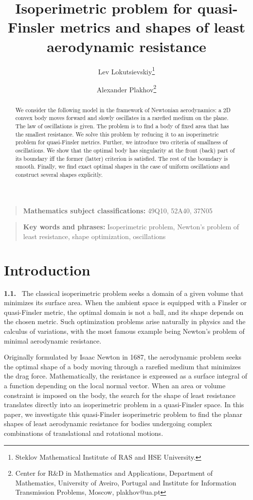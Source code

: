 \documentclass[a4paper,12pt]{article}
\title{Isoperimetric problem for quasi-Finsler metrics and shapes of least aerodynamic resistance}
\author{Lev Lokutsievskiy\thanks{Steklov Mathematical Institute of RAS and HSE University.} \and Alexander Plakhov\thanks{Center for R{\&}D in Mathematics and Applications, Department of Mathematics, University of Aveiro, Portugal and Institute for Information Transmission Problems, Moscow, plakhov@ua.pt}}
\theoremstyle{remark}
\theoremstyle{definition}
\begin{document}
\maketitle


\begin{abstract}
We consider the following model in the framework of Newtonian aerodynamics: a 2D convex body moves forward and slowly oscillates in a rarefied medium on the plane. The law of oscillations is given. The problem is to find a body of fixed area that has the smallest resistance. We solve this problem by reducing it to an isoperimetric problem for quasi-Finsler metrics. Further, we introduce two criteria of smallness of oscillations. We show that the optimal body has singularity at the front (back) part of its boundary iff the former (latter) criterion is satisfied. The rest of the boundary is smooth. Finally, we find exact optimal shapes in the case of uniform oscillations and construct several shapes explicitly.
\end{abstract}

\begin{quote}
{\small {\bf Mathematics subject classifications:} 49Q10, 52A40, 37N05}
\end{quote}

\begin{quote}
{\small {\bf Key words and phrases:}
Isoperimetric problem, Newton's problem of least resistance, shape optimization, oscillations}
\end{quote}


\section{Introduction}\label{sec1}

{\bf 1.1.} \ The classical isoperimetric problem seeks a domain of a given volume that minimizes its surface area. When the ambient space is equipped with a Finsler or quasi-Finsler metric, the optimal domain is not a ball, and its shape depends on the chosen metric.
Such optimization problems arise naturally in physics and the calculus of variations, with the most famous example being Newton's problem of minimal aerodynamic resistance.

Originally formulated by Isaac Newton in 1687, the aerodynamic problem seeks the optimal shape of a body moving through a rarefied medium that minimizes the drag force. Mathematically, the resistance is expressed as a surface integral of a function depending on the local normal vector. When an area or volume constraint is imposed on the body, the search for the shape of least resistance translates directly into an isoperimetric problem in a quasi-Finsler space. In this paper, we investigate this quasi-Finsler isoperimetric problem to find the planar shapes of least aerodynamic resistance for bodies undergoing complex combinations of translational and rotational motions.
\vspace{2mm}
\end{document}
